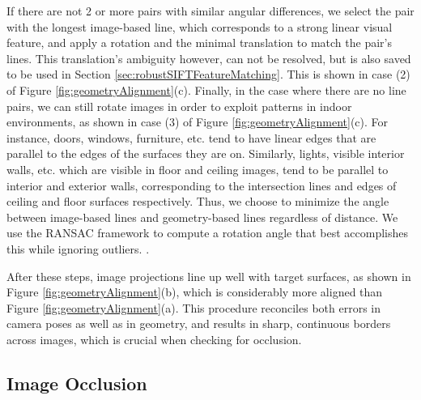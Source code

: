 \documentclass[]{spie}  %
\begin{document}
If there are not 2 or more pairs with similar angular differences, we
select the pair with the longest image-based line, which corresponds
to a strong linear visual feature, and apply a rotation and the
minimal translation to match the pair's lines. This translation's
ambiguity however, can not be resolved, but is also saved to be used
in Section \ref{sec:robustSIFTFeatureMatching}. This is shown in case
(2) of Figure \ref{fig:geometryAlignment}(c). Finally, in the case
where there are no line pairs, we can still rotate images in order to
exploit patterns in indoor environments, as shown in case (3) of
Figure \ref{fig:geometryAlignment}(c). For instance, doors, windows,
furniture, etc. tend to have linear edges that are parallel to the
edges of the surfaces they are on. Similarly, lights, visible interior
walls, etc. which are visible in floor and ceiling images, tend to be
parallel to interior and exterior walls, corresponding to the
intersection lines and edges of ceiling and floor surfaces
respectively. Thus, we choose to minimize the angle between
image-based lines and geometry-based lines regardless of distance. We
use the RANSAC framework to compute a rotation angle that best
accomplishes this while ignoring outliers. \cite{fischler1981random}.

After these steps, image projections line up well with target
surfaces, as shown in Figure \ref{fig:geometryAlignment}(b), which is
considerably more aligned than Figure
\ref{fig:geometryAlignment}(a). This procedure reconciles both errors
in camera poses as well as in geometry, and results in sharp,
continuous borders across images, which is crucial when checking for
occlusion.


\subsection{Image Occlusion}
\label{sec:imageOcclusion}
\end{document}
